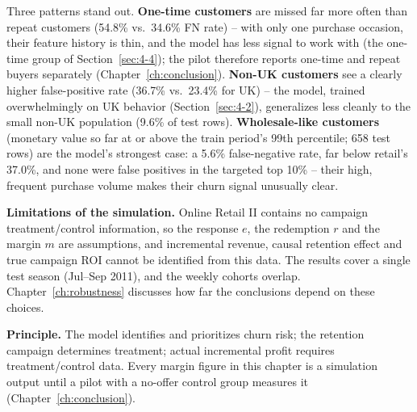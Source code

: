 Three patterns stand out. \textbf{One-time customers} are missed far more often than repeat customers (54.8\% vs.\ 34.6\% FN rate) -- with only one purchase occasion, their feature history is thin, and the model has less signal to work with (the one-time group of Section~\ref{sec:4-4}); the pilot therefore reports one-time and repeat buyers separately (Chapter~\ref{ch:conclusion}). \textbf{Non-UK customers} see a clearly higher false-positive rate (36.7\% vs.\ 23.4\% for UK) -- the model, trained overwhelmingly on UK behavior (Section~\ref{sec:4-2}), generalizes less cleanly to the small non-UK population (9.6\% of test rows). \textbf{Wholesale-like customers} (monetary value so far at or above the train period's 99th percentile; 658 test rows) are the model's strongest case: a 5.6\% false-negative rate, far below retail's 37.0\%, and none were false positives in the targeted top 10\% -- their high, frequent purchase volume makes their churn signal unusually clear.

\textbf{Limitations of the simulation.} Online Retail II contains no campaign treatment/control information, so the response $e$, the redemption $r$ and the margin $m$ are assumptions, and incremental revenue, causal retention effect and true campaign ROI cannot be identified from this data. The results cover a single test season (Jul--Sep 2011), and the weekly cohorts overlap. Chapter~\ref{ch:robustness} discusses how far the conclusions depend on these choices.

\textbf{Principle.} The model identifies and prioritizes churn risk; the retention campaign determines treatment; actual incremental profit requires treatment/control data. Every margin figure in this chapter is a simulation output until a pilot with a no-offer control group measures it (Chapter~\ref{ch:conclusion}).
